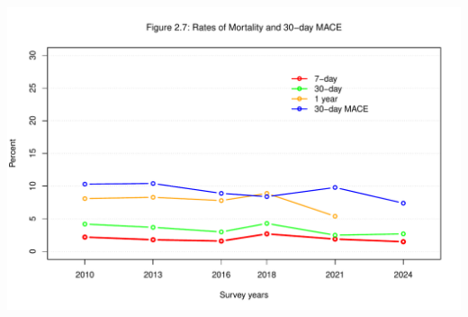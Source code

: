 \documentclass[
]{article}
\begin{document}
\includegraphics{‏‏ACSIS_2024_v1_with_trend_pdf_files/figure-latex/unnamed-chunk-142-1.pdf}

\pagebreak
\end{document}
